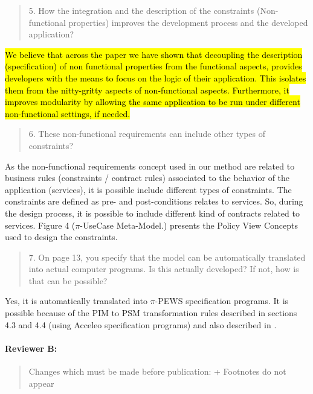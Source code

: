 \documentclass[12pt,a4wide]{article}
\begin{document}
\begin{quotation}\sf\footnotesize

5.	How the integration and the description of the constraints (Non-functional properties) improves the development process and the developed application? 
\end{quotation}

\noindent 
\hl{ We believe that across the paper we have shown that decoupling  the description (specification) of non functional properties from the functional aspects, provides developers with the means to focus on the logic of their application. This isolates them from the nitty-gritty aspects of non-functional aspects. Furthermore, it improves modularity by allowing the same application to be run under different non-functional settings, if needed. 
}

\begin{quotation}\sf\footnotesize

6.	These non-functional requirements can include other types of constraints? 
\end{quotation}

\noindent 
As the non-functional requirements concept used in our method are related to business rules (constraints / contract rules) associated to the behavior of the application (services), it is possible include different types of constraints. The constraints are defined as pre- and post-conditions relates to services. So, during the design process, it is possible to include different kind of contracts related to services.  Figure 4 ($\pi$-UseCase Meta-Model.) presents the Policy View Concepts used to design the constraints.

\begin{quotation}\sf\footnotesize

7.	On page 13, you specify that the model can be automatically translated into actual computer programs. Is this actually developed? If not, how is that can be possible? 
\end{quotation}
 
\noindent 
Yes, it is automatically translated into $\pi$-PEWS \cite{MPC08,BaCAM05,BHM06,BHM06rep} specification programs. It is possible because of the PIM to PSM transformation rules described in sections 4.3 and 4.4 (using Acceleo specification programs) and also described in \cite{placidoPhDThesis2012}.
 
 
\paragraph*{Reviewer B:} 
\begin{quotation}\sf\footnotesize

Changes which must be made before publication: 
+ Footnotes do not appear 
\end{quotation}
\end{document}
